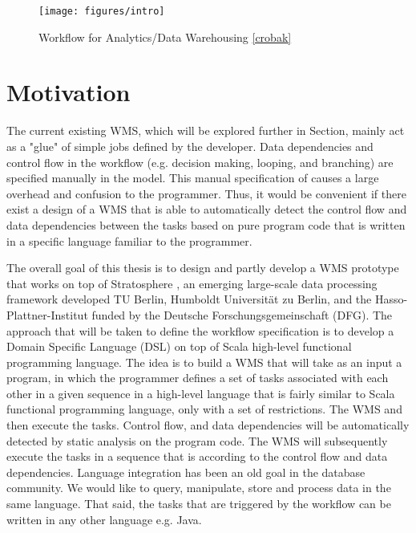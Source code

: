 \begin{figure}[here]
\centering
\texttt{[image: figures/intro]}
\caption{Workflow for Analytics/Data Warehousing \cref{crobak}}
\label{fig:intro}
\end{figure}

\section{Motivation}
The current existing WMS, which will be explored further in Section, mainly act as a "glue" of simple jobs defined by the developer. Data dependencies and control flow in the workflow (e.g. decision making, looping, and branching) are specified manually in the model. This manual specification of causes a large overhead and confusion to the programmer. Thus, it would be convenient if there exist a design of a WMS that is able to automatically detect the control flow and data dependencies between the tasks based on pure program code that is written in a specific language familiar to the programmer. 

The overall goal of this thesis is to design and partly develop a WMS prototype that works on top of Stratosphere \cite{alexandrov2014stratosphere}, an emerging large-scale data processing framework developed TU Berlin, Humboldt Universit\"{a}t zu Berlin, and the Hasso-Plattner-Institut funded by the Deutsche Forschungsgemeinschaft (DFG). The approach that will be taken to define the workflow specification is to develop a Domain Specific Language (DSL) \cite{van2000domain} on top of Scala \cite{odersky2004overview} high-level functional programming language. The idea is to build a WMS that will take as an input a program, in which the programmer defines a set of tasks associated with each other in a given sequence in a high-level language that is fairly similar to Scala functional programming language, only with a set of restrictions. The WMS and then execute the tasks. Control flow, and data dependencies will be automatically detected by static analysis on the program code. The WMS will subsequently execute the tasks in a sequence that is according to the control flow and data dependencies. Language integration has been an old goal in the database community. We would like to query, manipulate, store and process data in the same language. That said, the tasks that are triggered by the workflow can be written in any other language e.g. Java. 


